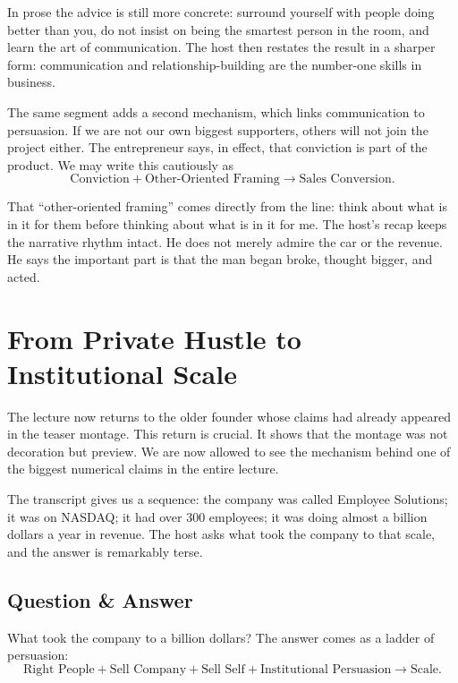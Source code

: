 In prose the advice is still more concrete: surround yourself with people doing better than you, do not insist on being the smartest person in the room, and learn the art of communication. The host then restates the result in a sharper form: communication and relationship-building are the number-one skills in business.

The same segment adds a second mechanism, which links communication to persuasion. If we are not our own biggest supporters, others will not join the project either. The entrepreneur says, in effect, that conviction is part of the product. We may write this cautiously as
\begin{equation}
\text{Conviction}+\text{Other-Oriented Framing} \to \text{Sales Conversion}.
\end{equation}

That ``other-oriented framing'' comes directly from the line: think about what is in it for them before thinking about what is in it for me. The host's recap keeps the narrative rhythm intact. He does not merely admire the car or the revenue. He says the important part is that the man began broke, thought bigger, and acted.

\section{From Private Hustle to Institutional Scale}

The lecture now returns to the older founder whose claims had already appeared in the teaser montage. This return is crucial. It shows that the montage was not decoration but preview. We are now allowed to see the mechanism behind one of the biggest numerical claims in the entire lecture.

The transcript gives us a sequence: the company was called Employee Solutions; it was on NASDAQ; it had over 300 employees; it was doing almost a billion dollars a year in revenue. The host asks what took the company to that scale, and the answer is remarkably terse.

\subsection{Question \& Answer}

What took the company to a billion dollars? The answer comes as a ladder of persuasion:
\begin{equation}
\text{Right People}+\text{Sell Company}+\text{Sell Self}+\text{Institutional Persuasion} \to \text{Scale}.
\end{equation}

